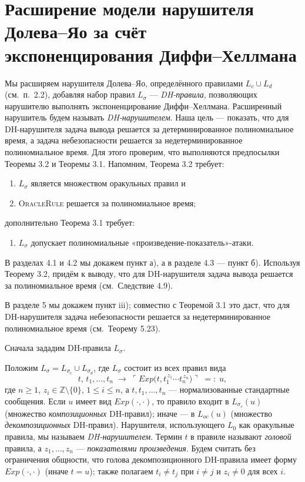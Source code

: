 \section{Расширение модели нарушителя Долева–Яо за счёт экспоненцирования Диффи–Хеллмана}

Мы расширяем нарушителя Долева–Яо, определённого правилами
\(L_c \cup L_d\) (см.~п.~2.2), добавляя набор правил \(L_\sigma\) —
\emph{DH-правила}, позволяющих нарушителю выполнять
экспоненцирование Диффи–Хеллмана.
Расширенный нарушитель будем называть \emph{DH-нарушителем}.
Наша цель — показать, что для DH-нарушителя задача вывода решается за детерминированное полиномиальное
время, а задача небезопасности решается за недетерминированное полиномиальное время.
Для этого проверим, что выполняются предпосылки
Теоремы 3.2 и Теоремы 3.1.
Напомним, Теорема 3.2 требует:
\begin{enumerate}
  \item \(L_\sigma\) является множеством оракульных правил и
  \item \textsc{OracleRule} решается за полиномиальное время;
\end{enumerate}
дополнительно Теорема 3.1 требует:
\begin{enumerate}
  \item \(L_\sigma\) допускает полиномиальные «произведение-показатель»-атаки.
\end{enumerate}

В разделах 4.1 и 4.2 мы докажем пункт а),
а в разделе 4.3 — пункт б).
Используя Теорему 3.2, придём к выводу,
что для DH-нарушителя задача вывода
решается за полиномиальное время
(см.~Следствие 4.9).

В разделе 5 мы докажем пункт iii);
совместно с Теоремой 3.1 это даст,
что для DH-нарушителя задача небезопасности
решается за недетерминированное полиномиальное время
(см.~Теорему 5.23).

\medskip
Сначала зададим DH-правила \(L_\sigma\).

\begin{definition}[4.1]
Положим \(L_\sigma = L_{\sigma_c}\cup L_{\sigma_d}\), где
\(L_\sigma\) состоит из всех правил вида
\[
  t,\,t_1,\dots,t_n
  \;\longrightarrow\;
  \ulcorner Exp\!\bigl(t,t_1^{\,z_1}\!\cdots t_n^{\,z_n}\bigr)\urcorner
  \;=:\;u,
\]
где \(n\ge1\), \(z_i\in\mathbb Z\setminus\{0\}\),
\(1\le i\le n\), а \(t,t_1,\dots,t_n\) — нормализованные
стандартные сообщения.  
Если \(u\) имеет вид \(Exp(\cdot,\cdot)\),
то правило входит в
\(L_{\sigma_c}(u)\) (множество \emph{композиционных} DH-правил);
иначе — в \(L_{oc}(u)\) (множество
\emph{декомпозиционных} DH-правил).
Нарушителя, использующего \(L_0\) как оракульные правила,
мы называем \emph{DH-нарушителем}.  
Термин \(t\) в правиле называют \emph{головой} правила, а
\(z_1,\dots,z_n\) — \emph{показателями произведения}.
Будем считать без ограничения общности, что
голова декомпозиционного DH-правила имеет форму \(Exp(\cdot,\cdot)\)
(иначе \(t=u\));
также полагаем \(t_i\neq t_j\) при \(i\neq j\) и \(z_i\neq0\) для всех \(i\).
\end{definition}

